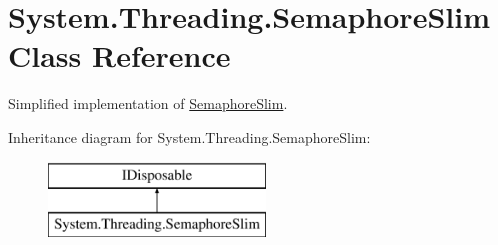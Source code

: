 \hypertarget{class_system_1_1_threading_1_1_semaphore_slim}{}\section{System.\+Threading.\+Semaphore\+Slim Class Reference}
\label{class_system_1_1_threading_1_1_semaphore_slim}


Simplified implementation of \hyperlink{class_system_1_1_threading_1_1_semaphore_slim}{Semaphore\+Slim}.  


Inheritance diagram for System.\+Threading.\+Semaphore\+Slim\+:\begin{figure}[H]
\begin{center}
\leavevmode
\includegraphics[height=2.000000cm]{class_system_1_1_threading_1_1_semaphore_slim}
\end{center}
\end{figure}
